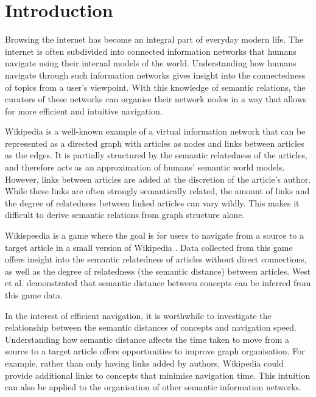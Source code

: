 \section{Introduction}
\label{sec:introduction}
Browsing the internet has become an integral part of everyday modern life. The internet is often subdivided into connected information networks that humans navigate using their internal models of the world. Understanding how humans navigate through such information networks gives insight into the connectedness of topics from a user's viewpoint. With this knowledge of semantic relations, the curators of these networks can organise their network nodes in a way that allows for more efficient and intuitive navigation.

Wikipedia is a well-known example of a virtual information network that can be represented as a directed graph with articles as nodes and links between articles as the edges. It is partially structured by the semantic relatedness of the articles, and therefore acts as an approximation of humans' semantic world models. However, links between articles are added at the discretion of the article's author. While these links are often strongly semantically related, the amount of links and the degree of relatedness between linked articles can vary wildly. This makes it difficult to derive semantic relations from graph structure alone.

Wikispeedia is a game where the goal is for users to navigate from a source to a target article in a small version of Wikipedia \cite{semdistances}\cite{humanwayfinding}. Data collected from this game offers insight into the semantic relatedness of articles without direct connections, as well as the degree of relatedness (the semantic distance) between articles. West et al. \cite{humanwayfinding} demonstrated that semantic distance between concepts can be inferred from this game data.

In the interest of efficient navigation, it is worthwhile to investigate the relationship between the semantic distances of concepts and navigation speed. Understanding how semantic distance affects the time taken to move from a source to a target article offers opportunities to improve graph organisation. For example, rather than only having links added by authors, Wikipedia could provide additional links to concepts that minimise navigation time. This intuition can also be applied to the organisation of other semantic information networks. 

